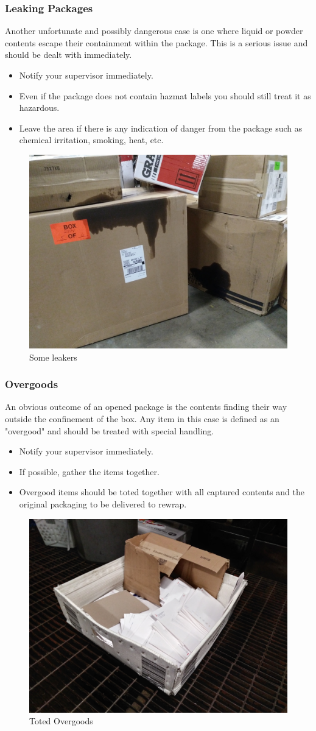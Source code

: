 \documentclass[12pt]{article}
\begin{document}
\subsubsection{Leaking Packages}
Another unfortunate and possibly dangerous case is one where liquid or powder contents escape their containment within the package. This is a serious issue and should be dealt with immediately. 

\begin{itemize}
    \item Notify your supervisor immediately.
    \item Even if the package does not contain hazmat labels you should still treat it as hazardous.
    \item Leave the area if there is any indication of danger from the package such as chemical irritation, smoking, heat, etc.
\end{itemize}

\begin{figure}[H]
    \centering
    \includegraphics[width=0.4\linewidth]{20171222_020653}
    \caption{Some leakers}
\end{figure}

\subsubsection{Overgoods}
An obvious outcome of an opened package is the contents finding their way outside the confinement of the box. Any item in this case is defined as an "overgood" and should be treated with special handling. 

\begin{itemize}
    \item Notify your supervisor immediately.
    \item If possible, gather the items together. 
    \item Overgood items should be toted together with all captured contents and the original packaging to be delivered to rewrap.
\end{itemize}

\begin{figure}[H]
    \centering
    \includegraphics[width=0.5\linewidth]{20171222_013019_HDR}
    \caption{Toted Overgoods}
\end{figure}
\end{document}
